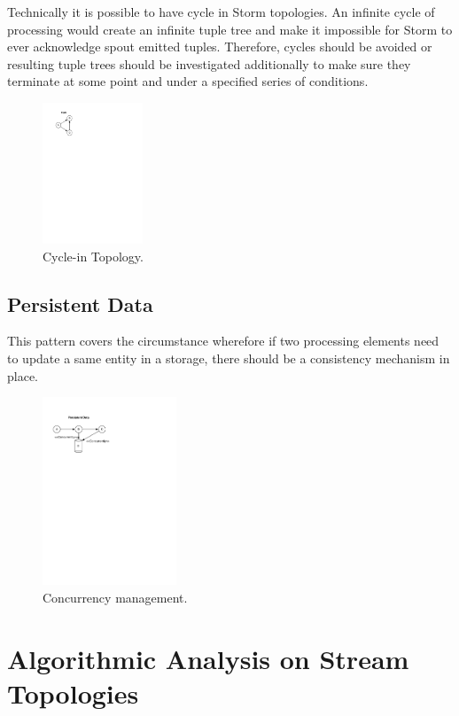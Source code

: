 Technically it is possible to have cycle in Storm topologies. An infinite cycle of processing would create an infinite tuple tree and make it impossible for Storm to ever acknowledge spout emitted tuples. Therefore, cycles should be avoided or resulting tuple trees should be investigated additionally to make sure they terminate at some point and under a specified series of conditions.

\begin{figure}[H]
	\begin{center}
		\includegraphics[width=3cm]{images/cycle}
		\caption{Cycle-in Topology.}
		\label{fig:cycle}
	\end{center}
\end{figure}

\subsection{Persistent Data}

This pattern covers the circumstance wherefore if two processing elements need to update a same entity in a storage, there should be a consistency mechanism in place. 


\begin{figure}[H]
	\begin{center}
		\includegraphics[width=4cm]{images/persistence}
		\caption{Concurrency management.}
		\label{fig:persistence}
	\end{center}
\end{figure}

\section{Algorithmic Analysis on Stream Topologies}\label{algo}

